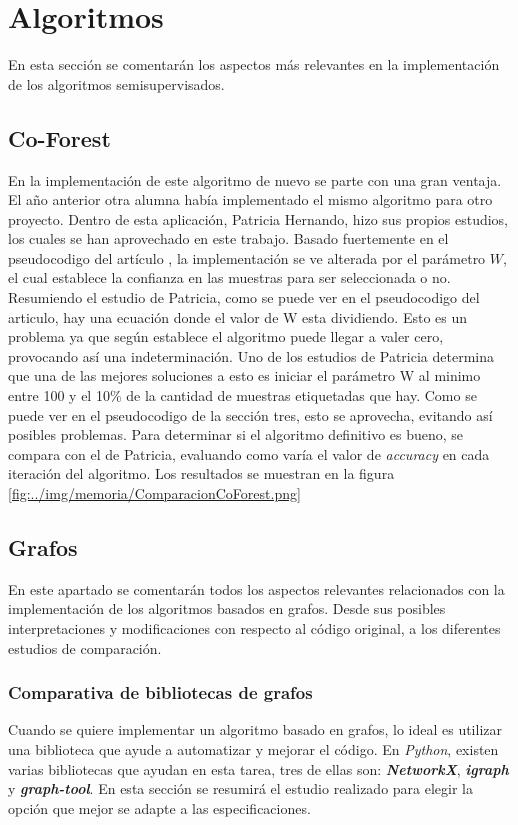 \section{Algoritmos}
En esta sección se comentarán los aspectos más relevantes en la implementación de los algoritmos semisupervisados.
\subsection{Co-Forest}\label{sec5:coforest}
En la implementación de este algoritmo de nuevo se parte con una gran ventaja. El año anterior otra alumna había implementado el mismo algoritmo para otro proyecto. Dentro de esta aplicación, Patricia Hernando, hizo sus propios estudios, los cuales se han aprovechado en este trabajo.
Basado fuertemente en el pseudocodigo del artículo \cite{IEEE:CoForest}, la implementación se ve alterada por el parámetro $W$, el cual establece la confianza en las muestras para ser seleccionada o no. Resumiendo el estudio de Patricia, como se puede ver en el pseudocodigo del articulo, hay una ecuación donde el valor de W esta dividiendo. Esto es un problema ya que según establece el algoritmo puede llegar a valer cero, provocando así una indeterminación. Uno de los estudios de Patricia determina que una de las mejores soluciones a esto es iniciar el parámetro W al minimo entre 100 y el 10\% de la cantidad de muestras etiquetadas que hay. Como se puede ver en el pseudocodigo de la sección tres, esto se aprovecha, evitando así posibles problemas.
Para determinar si el algoritmo definitivo es bueno, se compara con el de Patricia, evaluando como varía el valor de \textit{accuracy} en cada iteración del algoritmo. Los resultados se muestran en la figura \ref{fig:../img/memoria/ComparacionCoForest.png}

\subsection{Grafos}
En este apartado se comentarán todos los aspectos relevantes relacionados con la implementación de los algoritmos basados en grafos. Desde sus posibles interpretaciones y modificaciones con respecto al código original, a los diferentes estudios de comparación.

\subsubsection{Comparativa de bibliotecas de grafos}
Cuando se quiere implementar un algoritmo basado en grafos, lo ideal es utilizar una biblioteca que ayude a automatizar y mejorar el código. En \textit{Python}, existen varias bibliotecas que ayudan en esta tarea, tres de ellas son: \textit{\textbf{NetworkX}}, \textit{\textbf{igraph}} y \textit{\textbf{graph-tool}}. En esta sección se resumirá el estudio realizado para elegir la opción que mejor se adapte a las especificaciones.

